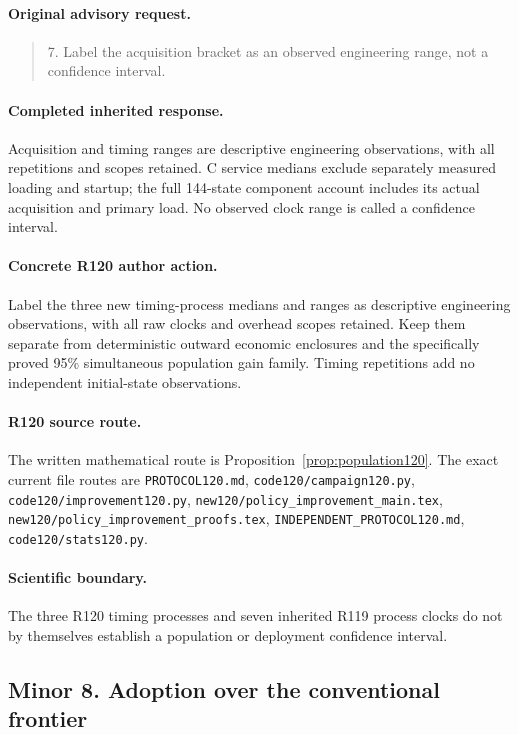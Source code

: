 \paragraph{Original advisory request.}
\begin{quote}
7. Label the acquisition bracket as an observed engineering range, not a confidence interval.
\end{quote}
\paragraph{Completed inherited response.}
Acquisition and timing ranges are descriptive engineering observations, with all repetitions and scopes retained. C service medians exclude separately measured loading and startup; the full 144-state component account includes its actual acquisition and primary load. No observed clock range is called a confidence interval.
\paragraph{Concrete R120 author action.}
Label the three new timing-process medians and ranges as descriptive engineering observations, with all raw clocks and overhead scopes retained. Keep them separate from deterministic outward economic enclosures and the specifically proved 95\% simultaneous population gain family. Timing repetitions add no independent initial-state observations.
\paragraph{R120 source route.}
The written mathematical route is Proposition~\ref{prop:population120}. The exact current file routes are \nolinkurl{PROTOCOL120.md}, \nolinkurl{code120/campaign120.py}, \nolinkurl{code120/improvement120.py}, \nolinkurl{new120/policy_improvement_main.tex}, \nolinkurl{new120/policy_improvement_proofs.tex}, \nolinkurl{INDEPENDENT_PROTOCOL120.md}, \nolinkurl{code120/stats120.py}.
\paragraph{Scientific boundary.}
The three R120 timing processes and seven inherited R119 process clocks do not by themselves establish a population or deployment confidence interval.

\subsection{Minor 8. Adoption over the conventional frontier}
\label{response120:minor-8}
